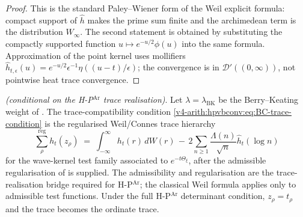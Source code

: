 \begin{proof}
This is the standard Paley--Wiener form of the Weil explicit formula:
compact support of \(\widehat h\) makes the prime sum finite and the
archimedean term is the distribution \(W_{\infty}\). The second
statement is obtained by substituting the compactly supported function
\(u\mapsto e^{-u/2}\phi(u)\) into the same formula. Approximation of
the point kernel uses mollifiers
\(\widehat h_{t,\epsilon}(u)=e^{-u/2}\epsilon^{-1}\eta((u-t)/\epsilon)\);
the convergence is in \(\mathcal D'((0,\infty))\), not pointwise heat
trace convergence.
\end{proof}

\begin{theorem}
\label{v4-arith:hpar-det:thm:hierarchy-condition}
\ClaimStatusProvedHere \emph{(conditional on the H-P\(^{\mathrm{Ar}}\)
trace realisation)}. Let \(\lambda=\lambda_{\mathrm{BK}}\) be the
Berry--Keating weight of
. The
trace-compatibility condition
\eqref{v4-arith:hpvbconv:eq:BC-trace-condition} is the regularised
Weil/Connes trace hierarchy
\begin{equation}
\label{v4-arith:hpar-det:eq:weil-explicit}
\sum_{\rho}^{\mathrm{reg}}h_{t}(z_{\rho})\;=\;
\int_{-\infty}^{\infty}h_{t}(r)\,dW(r)
\,-\,2\sum_{n\geq 1}\frac{\Lambda(n)}{\sqrt{n}}
\widehat{h}_{t}(\log n)
\end{equation}
for the wave-kernel test family associated to
\(e^{-t\Theta_{\xi}}\), after the admissible regularisation of
 is supplied. The
admissibility and regularisation are the trace-realisation
bridge required for H-P\(^{\mathrm{Ar}}\); the classical Weil formula
applies only to admissible test functions. Under the full
H-P\(^{\mathrm{Ar}}\) determinant condition, \(z_{\rho}=t_{\rho}\) and
the trace becomes the ordinate trace.
\end{theorem}

